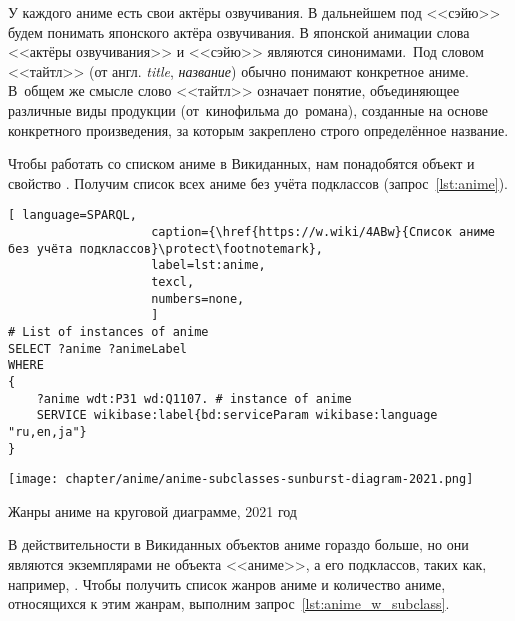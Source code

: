 У каждого аниме есть свои актёры озвучивания. 
В дальнейшем под <<сэйю>> будем понимать японского актёра озвучивания. 
В японской анимации слова <<актёры озвучивания>> и <<сэйю>> являются синонимами.\, %
%
Под словом <<тайтл>> (от англ. \emph{title}, \emph{название}) обычно понимают конкретное аниме\autocite{anime_social}. 
В~общем же смысле слово <<тайтл>> означает понятие, объединяющее различные виды продукции 
(от~кино\-фильма до~романа), созданные на основе конкретного произведения, за которым закреплено строго определённое название\autocite{anime_title_def}.

Чтобы работать со списком аниме в Викиданных, 
нам понадобятся объект  и свойство . 
Получим список всех аниме без учёта подклассов (запрос~\ref{lst:anime}).

\newpage

\begin{lstlisting}[ language=SPARQL, 
                    caption={\href{https://w.wiki/4ABw}{Список аниме без учёта подклассов}\protect\footnotemark},
                    label=lst:anime,
                    texcl,
                    numbers=none,
                    ]
# List of instances of anime
SELECT ?anime ?animeLabel
WHERE
{
    ?anime wdt:P31 wd:Q1107. # instance of anime
    SERVICE wikibase:label{bd:serviceParam wikibase:language "ru,en,ja"}
}
\end{lstlisting}%

\begin{marginfigure}[1\baselineskip]
{\texttt{[image: chapter/anime/anime-subclasses-sunburst-diagram-2021.png]}}
\vspace{-7pt}
\caption{Жанры аниме на круговой диаграмме, 2021 год}%
\label{fig:anime_piechart}
\end{marginfigure}

В действительности в Викиданных объектов аниме гораздо больше, 
но они являются экземплярами не объекта <<аниме>>, а его подклассов, 
таких как, например, . 
Чтобы получить список жанров аниме и количество аниме, 
относящихся к этим жанрам, выполним запрос~\ref{lst:anime_w_subclass}.

